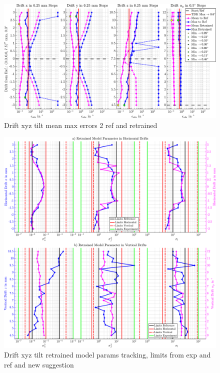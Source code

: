 \begin{figure}[tbph]
	\centering
	\includegraphics[width=\linewidth]{appendix/images/8-Ergebnisse-Experimente/Drift-Model-Errors}
	\caption[Drift xyz tilt mean max errors 2 ref and retrained]{Drift xyz tilt mean max errors 2 ref and retrained}
	\label{fig:drift-model-errors}
\end{figure}


\begin{figure}[tbph]
	\centering
	\includegraphics[width=\linewidth]{appendix/images/8-Ergebnisse-Experimente/Drift-Model-Parms}
	\caption[Drift xyz tilt retrained model params tracking]{Drift xyz tilt retrained model params tracking, limits from exp and ref and new suggestion}
	\label{fig:drift-model-parms}
\end{figure}

